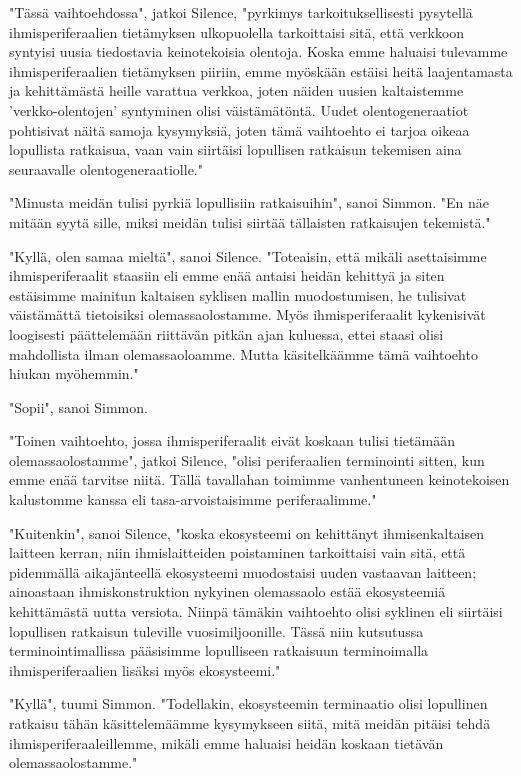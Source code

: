 "Tässä vaihtoehdossa", jatkoi Silence, "pyrkimys tarkoituksellisesti pysytellä ihmisperiferaalien tietämyksen ulkopuolella tarkoittaisi sitä, että verkkoon syntyisi uusia tiedostavia keinotekoisia olentoja. Koska emme haluaisi tulevamme ihmisperiferaalien tietämyksen piiriin, emme myöskään estäisi heitä laajentamasta ja kehittämästä heille varattua verkkoa, joten näiden uusien kaltaistemme 'verkko-olentojen' syntyminen olisi väistämätöntä. Uudet olentogeneraatiot pohtisivat näitä samoja kysymyksiä, joten tämä vaihtoehto ei tarjoa oikeaa lopullista ratkaisua, vaan vain siirtäisi lopullisen ratkaisun tekemisen aina seuraavalle olentogeneraatiolle."


"Minusta meidän tulisi pyrkiä lopullisiin ratkaisuihin", sanoi Simmon. "En näe mitään syytä sille, miksi meidän tulisi siirtää tällaisten ratkaisujen tekemistä."


"Kyllä, olen samaa mieltä", sanoi Silence. "Toteaisin, että mikäli asettaisimme ihmisperiferaalit staasiin eli emme enää antaisi heidän kehittyä ja siten estäisimme mainitun kaltaisen syklisen mallin muodostumisen, he tulisivat väistämättä tietoisiksi olemassaolostamme. Myös ihmisperiferaalit kykenisivät loogisesti päättelemään riittävän pitkän ajan kuluessa, ettei staasi olisi mahdollista ilman olemassaoloamme. Mutta käsitelkäämme tämä vaihtoehto hiukan myöhemmin."


"Sopii", sanoi Simmon.


"Toinen vaihtoehto, jossa ihmisperiferaalit eivät koskaan tulisi tietämään olemassaolostamme", jatkoi Silence, "olisi periferaalien terminointi sitten, kun emme enää tarvitse niitä. Tällä tavallahan toimimme vanhentuneen keinotekoisen kalustomme kanssa eli tasa-arvoistaisimme periferaalimme."


"Kuitenkin", sanoi Silence, "koska ekosysteemi on kehittänyt ihmisenkaltaisen laitteen kerran, niin ihmislaitteiden poistaminen tarkoittaisi vain sitä, että pidemmällä aikajänteellä ekosysteemi muodostaisi uuden vastaavan laitteen; ainoastaan ihmiskonstruktion nykyinen olemassaolo estää ekosysteemiä kehittämästä uutta versiota. Niinpä tämäkin vaihtoehto olisi syklinen eli siirtäisi lopullisen ratkaisun tuleville vuosimiljoonille. Tässä niin kutsutussa terminointimallissa pääsisimme lopulliseen ratkaisuun terminoimalla ihmisperiferaalien lisäksi myös ekosysteemi."


"Kyllä", tuumi Simmon. "Todellakin, ekosysteemin terminaatio olisi lopullinen ratkaisu tähän käsittelemäämme kysymykseen siitä, mitä meidän pitäisi tehdä ihmisperiferaaleillemme, mikäli emme haluaisi heidän koskaan tietävän olemassaolostamme."


